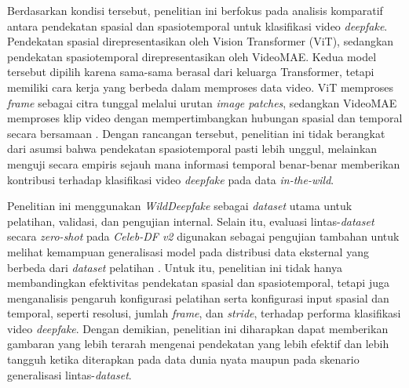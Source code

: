 Berdasarkan kondisi tersebut, penelitian ini berfokus pada analisis komparatif antara pendekatan spasial dan spasiotemporal untuk klasifikasi video \textit{deepfake}. Pendekatan spasial direpresentasikan oleh Vision Transformer (ViT), sedangkan pendekatan spasiotemporal direpresentasikan oleh VideoMAE. Kedua model tersebut dipilih karena sama-sama berasal dari keluarga Transformer, tetapi memiliki cara kerja yang berbeda dalam memproses data video. ViT memproses \textit{frame} sebagai citra tunggal melalui urutan \textit{image patches}, sedangkan VideoMAE memproses klip video dengan mempertimbangkan hubungan spasial dan temporal secara bersamaan \cite{dosovitskiy2021imageworth16x16words,tong2022videomaemaskedautoencodersdataefficient}. Dengan rancangan tersebut, penelitian ini tidak berangkat dari asumsi bahwa pendekatan spasiotemporal pasti lebih unggul, melainkan menguji secara empiris sejauh mana informasi temporal benar-benar memberikan kontribusi terhadap klasifikasi video \textit{deepfake} pada data \textit{in-the-wild}. \par

Penelitian ini menggunakan \textit{WildDeepfake} sebagai \textit{dataset} utama untuk pelatihan, validasi, dan pengujian internal. Selain itu, evaluasi lintas-\textit{dataset} secara \textit{zero-shot} pada \textit{Celeb-DF v2} digunakan sebagai pengujian tambahan untuk melihat kemampuan generalisasi model pada distribusi data eksternal yang berbeda dari \textit{dataset} pelatihan \cite{li2020celebdflargescalechallengingdataset}. Untuk itu, penelitian ini tidak hanya membandingkan efektivitas pendekatan spasial dan spasiotemporal, tetapi juga menganalisis pengaruh konfigurasi pelatihan serta konfigurasi input spasial dan temporal, seperti resolusi, jumlah \textit{frame}, dan \textit{stride}, terhadap performa klasifikasi video \textit{deepfake}. Dengan demikian, penelitian ini diharapkan dapat memberikan gambaran yang lebih terarah mengenai pendekatan yang lebih efektif dan lebih tangguh ketika diterapkan pada data dunia nyata maupun pada skenario generalisasi lintas-\textit{dataset}. \par

